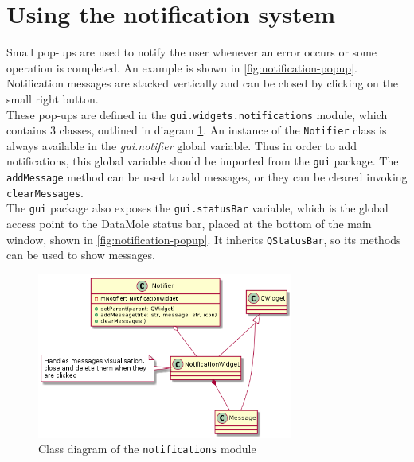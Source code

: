 \section{Using the notification system}\label{sec:notifications}
Small pop-ups are used to notify the user whenever an error occurs or some operation is completed. An example is shown in \cref{fig:notification-popup}. Notification messages are stacked vertically and can be closed by clicking on the small right button.\\
These pop-ups are defined in the \texttt{gui.widgets.notifications} module, which contains 3 classes, outlined in diagram \cref{fig:notifications-uml}. An instance of the \texttt{Notifier} class is always available in the \textit{gui.notifier} global variable. Thus in order to add notifications, this global variable should be imported from the \texttt{gui} package. The \texttt{addMessage} method can be used to add messages, or they can be cleared invoking \texttt{clearMessages}.\\
The \texttt{gui} package also exposes the \texttt{gui.statusBar} variable, which is the global access point to the DataMole status bar, placed at the bottom of the main window, shown in \cref{fig:notification-popup}. It inherits \texttt{QStatusBar}, so its methods can be used to show messages.
\begin{figure}[p]
	\centering
	\includegraphics[width=0.75\textwidth]{../uml/notifications}
	\caption{Class diagram of the \texttt{notifications} module}
	\label{fig:notifications-uml}
\end{figure}
